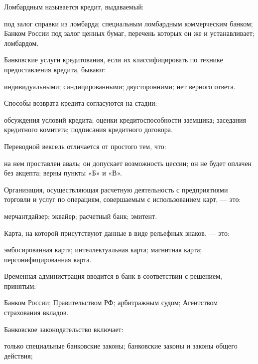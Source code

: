 \documentclass[12pt, table]{exam}
\begin{document}
\begin{questions}
\begin{multicols}{2}
\begin{choices}
	 \end{choices}
\question Ломбардным называется кредит, выдаваемый:
	 \begin{choices}
	 \CC под залог справки из ломбарда;
	 \choice специальным ломбардным коммерческим банком;
	 \choice Банком России под залог ценных бумаг, перечень которых он же и устанавливает;
	 \choice ломбардом.
	 \end{choices}
\question Банковские услуги кредитования, если их классифицировать по технике предоставления кредита, бывают:
	 \begin{choices}
	 \choice индивидуальными;
	 \choice синдицированными;
	 \CC двусторонними;
	 \choice нет верного ответа.
	 \end{choices}
\question Способы возврата кредита согласуются на стадии:
	 \begin{choices}
	 \choice обсуждения условий кредита;
	 \choice оценки кредитоспособности заемщика;
	 \choice заседания кредитного комитета;
	 \CC подписания кредитного договора.
	 \end{choices}
\question Переводной вексель отличается от простого тем, что:
	 \begin{choices}
	 \choice на нем проставлен аваль;
	 \CC он допускает возможность цессии;
	 \choice он не будет оплачен без акцепта;
	 \choice верны пункты «Б» и «В».
	 \end{choices}
\question Организация, осуществляющая расчетную деятельность с предприятиями торговли и услуг по операциям, совершаемым с использованием карт, — это:
	 \begin{choices}
	 \choice мерчантдайзер;
	 \choice эквайер;
	 \choice расчетный банк;
	 \CC эмитент.
	 \end{choices}
\question Карта, на которой присутствуют данные в виде рельефных знаков, — это:
	 \begin{choices}
	 \choice эмбосированная карта;
	 \choice интеллектуальная карта;
	 \CC магнитная карта;
	 \choice персонифицированная карта.
	 \end{choices}
\question Временная администрация вводится в банк в соответствии с решением, принятым:
	 \begin{choices}
	 \choice Банком России;
	 \CC Правительством РФ;
	 \choice арбитражным судом;
	 \choice Агентством страхования вкладов.
	 \end{choices}
\question Банковское законодательство включает:
	 \begin{choices}
	 \choice только специальные банковские законы;
	 \CC банковские законы и законы общего действия;

\end{choices}
\end{multicols}
\end{questions}
\end{document}
